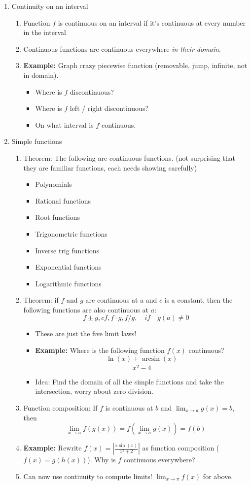 \documentclass{article}
\begin{document}
\begin{enumerate}
\item Continuity on an interval
\begin{enumerate}
\item Function $f$ is continuous on an interval if it's continuous at every number in the interval
\item  Continuous functions are continuous everywhere \emph{in their domain}.
\item {\bf Example:} Graph crazy piecewise function (removable, jump, infinite, not in domain).  
\begin{itemize}
\item Where is $f$ discontinuous?
\item Where is $f$ left / right discontinuous?
\item On what interval is $f$ continuous.
\end{itemize}
\end{enumerate}

\item Simple functions
\begin{enumerate}
\item Theorem: The following are continuous functions. (not surprising that they are familiar functions, each needs showing carefully)
\begin{itemize}
\item Polynomials
\item Rational functions
\item Root functions
\item Trigonometric functions
\item Inverse trig functions
\item Exponential functions
\item Logarithmic functions
\end{itemize}
\item Theorem:  if $f$ and $g$ are continuous at a and $c$ is a constant, then the following functions are also continuous at $a$:
$$
f\pm g, cf, f\cdot g, f/g,\quad if \quad g(a) \neq 0 
$$
\begin{itemize}
\item These are just the five limit laws!
\item {\bf Example: } Where is the following function $f(x)$ continuous?
$$
\frac{\ln(x)+\arcsin(x)}{x^2-4}
$$
\item Idea: Find the domain of all the simple functions and take the intersection, worry about zero division.
\end{itemize}
\item Function composition: If $f$ is continuous at $b$ and $\lim_{x\rightarrow a} g(x) = b$, then
$$
\lim_{x\rightarrow a} f(g(x)) = f(\lim_{x\rightarrow a} g(x) ) = f(b)
$$
\item {\bf Example: } Rewrite $f(x) = \left| \frac{x\sin(x)}{x^2+2} \right|$ as function composition ($f(x)=g(h(x))$). Why is $f$ continuous everywhere?
\item Can now use continuity to compute limits! $\lim_{x\rightarrow \pi} f(x)$ for above.
\end{enumerate}


\end{enumerate}
\end{document}
